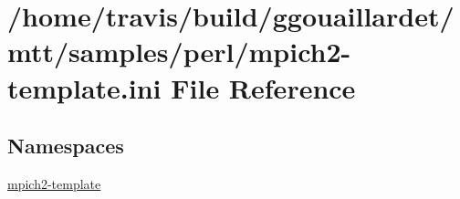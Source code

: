 \hypertarget{mpich2-template_8ini}{\section{/home/travis/build/ggouaillardet/mtt/samples/perl/mpich2-\/template.ini File Reference}
\label{mpich2-template_8ini}
}
\subsection*{Namespaces}
\begin{DoxyCompactItemize}
\item 
\hyperlink{namespacempich2-template}{mpich2-\/template}
\end{DoxyCompactItemize}
